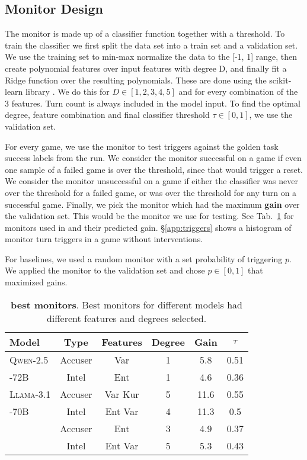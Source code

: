 \subsection{Monitor Design}
\label{app:classifiers}
The monitor is made up of a classifier function together with a threshold.
To train the classifier we first split the data set into a train set and a validation set. We use the training set to min-max normalize the data to the [-1, 1] range, then create polynomial features over input features with degree D, and finally fit a Ridge function over the resulting polynomials. These are done using the scikit-learn library  \cite{scikit-learn}. We do this for $D\in[1,2,3,4,5]$ and for every combination of the 3 features. Turn count is always included in the model input.
To find the optimal degree, feature combination and final classifier threshold $\tau \in [0,1]$, we use the validation set. 

For every game, we use the monitor to test triggers against the golden task success labels from the run. We consider the monitor successful on a game if even one sample of a failed game is over the threshold, since that would trigger a reset. We consider the monitor unsuccessful on a game if either the classifier was never over the threshold for a failed game, or was over the threshold for any turn on a successful game. Finally, we pick the monitor which had the maximum \textbf{gain} over the validation set. This would be the monitor we use for testing. See Tab.~\ref{tab:classifiers_used} for monitors used in \ourenvasym{} and their predicted gain. \S\ref{app:triggers} shows a histogram of monitor turn triggers in a game without interventions.

For baselines, we used a random monitor with a set probability of triggering $p$. We applied the monitor to the validation set and chose $p\in[0,1]$ that maximized gains.

\begin{table}[t]
\centering
\setlength\tabcolsep{3.8pt}
\footnotesize
  \begin{tabular}{lccccc}
    \toprule
    \textbf{Model} & \textbf{Type} & \textbf{Features} & \textbf{Degree} & \textbf{Gain} & $\tau$\\
    \midrule
    \textsc{Qwen-2.5} & Accuser & Var & 1 & 5.8 & 0.51\\
    \hspace{0.5cm}\textsc{-72B} & Intel & Ent & 1 & 4.6 & 0.36 \\
    \midrule
    \textsc{Llama-3.1} & Accuser & Var Kur & 5 & 11.6 & 0.55\\
    \hspace{0.5cm}\textsc{-70B} & Intel & Ent Var & 4 & 11.3 & 0.5 \\  
    \midrule
    \multirow{2}{*}{\textsc{\gpt{}}} & Accuser & Ent & 3 & 4.9 & 0.37 \\
    & Intel & Ent Var & 5 & 5.3 & 0.43\\
    \bottomrule
  \end{tabular}
  \caption{\textbf{\ourenvasym{} best monitors}. Best monitors for different models had different features and degrees selected.}
  \label{tab:classifiers_used}
\end{table}



